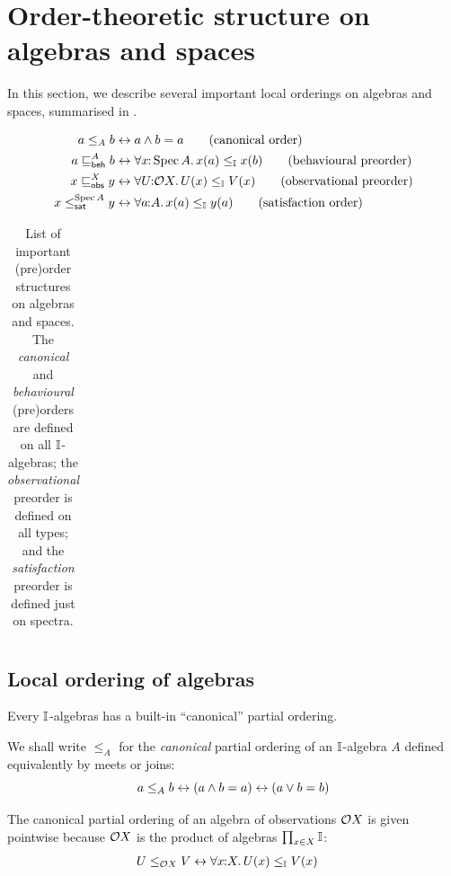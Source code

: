 \section{Order-theoretic structure on algebras and spaces}\label{sec:order-theoretic-structure}

In this section, we describe several important local orderings on algebras and spaces, summarised in .

\begin{table}[ht]
  \begin{align*}
    a\le_A b &\eq a\wedge b = a
    \tag{canonical order}
    \\
    a\behle[A]b &\eq 
    \fa{x}{\spec{A}}x(a)\le_\I x(b)
    \tag{behavioural preorder}
    \\
    x\obsle[X]y &\eq \fa{U}{\opens{X}} U(x)\le_\I V(x)
    \tag{observational preorder}
    \\ 
    x\satle[\spec{A}]y &\eq \fa{a}{A} x(a)\le_\I y(a)
    \tag{satisfaction order}
  \end{align*}
  \begin{tabular}{ll}
  \end{tabular}
  \caption{List of important (pre)order structures on algebras and spaces. The \emph{canonical} and \emph{behavioural} (pre)orders are defined on all $\mathbb{I}$-algebras; the \emph{observational} preorder is defined on all types; and the \emph{satisfaction} preorder is defined just on spectra.}
  \label{table:orders}
\end{table}


\subsection{Local ordering of algebras}

Every $\mathbb{I}$-algebras has a built-in ``canonical'' partial ordering.

\begin{definition}
  We shall write $\le_A$ for the \emph{canonical} partial ordering of an $\mathbb{I}$-algebra $A$ defined equivalently by meets or joins:
  \[ 
    a\le_A b \leftrightarrow (a\wedge b = a) \leftrightarrow (a\vee b = b)
  \]
\end{definition}

\begin{example}
  The canonical partial ordering of an algebra of observations $\mathcal{O}{X}$ is given pointwise because $\mathcal{O}{X}$ is the product of algebras $\prod_{x\in X}\mathbb{I}$:
  \begin{align*}
    U\le_{\mathcal{O}{X}} V 
    &\leftrightarrow \forall x\!\colon\!\!X\mathpunct{.} U(x)\le_{\mathbb{I}} V(x)
  \end{align*}
\end{example}

